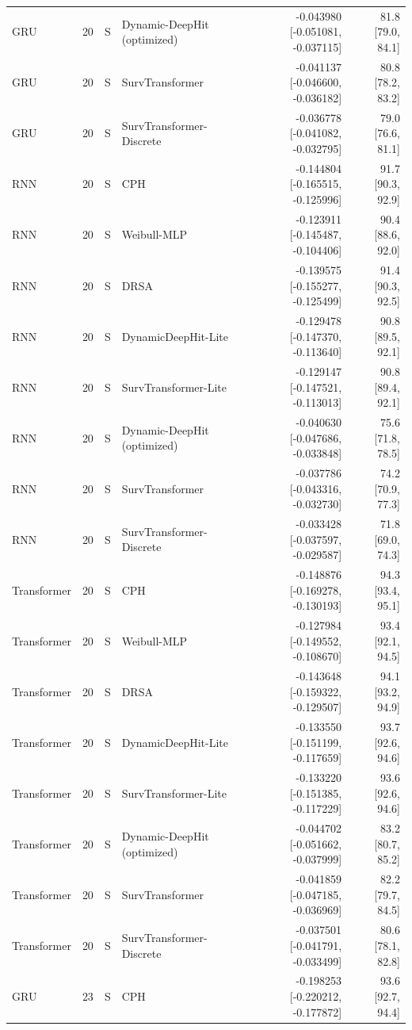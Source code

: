\begin{longtable}{lll p{3.0cm} rr}
GRU & 20 & S & Dynamic-DeepHit (optimized) & -0.043980 [-0.051081, -0.037115] & 81.8 [79.0, 84.1]\\
GRU & 20 & S & SurvTransformer & -0.041137 [-0.046600, -0.036182] & 80.8 [78.2, 83.2]\\
GRU & 20 & S & SurvTransformer-Discrete & -0.036778 [-0.041082, -0.032795] & 79.0 [76.6, 81.1]\\
RNN & 20 & S & CPH & -0.144804 [-0.165515, -0.125996] & 91.7 [90.3, 92.9]\\
RNN & 20 & S & Weibull-MLP & -0.123911 [-0.145487, -0.104406] & 90.4 [88.6, 92.0]\\
RNN & 20 & S & DRSA & -0.139575 [-0.155277, -0.125499] & 91.4 [90.3, 92.5]\\
RNN & 20 & S & DynamicDeepHit-Lite & -0.129478 [-0.147370, -0.113640] & 90.8 [89.5, 92.1]\\
RNN & 20 & S & SurvTransformer-Lite & -0.129147 [-0.147521, -0.113013] & 90.8 [89.4, 92.1]\\
RNN & 20 & S & Dynamic-DeepHit (optimized) & -0.040630 [-0.047686, -0.033848] & 75.6 [71.8, 78.5]\\
RNN & 20 & S & SurvTransformer & -0.037786 [-0.043316, -0.032730] & 74.2 [70.9, 77.3]\\
RNN & 20 & S & SurvTransformer-Discrete & -0.033428 [-0.037597, -0.029587] & 71.8 [69.0, 74.3]\\
Transformer & 20 & S & CPH & -0.148876 [-0.169278, -0.130193] & 94.3 [93.4, 95.1]\\
Transformer & 20 & S & Weibull-MLP & -0.127984 [-0.149552, -0.108670] & 93.4 [92.1, 94.5]\\
Transformer & 20 & S & DRSA & -0.143648 [-0.159322, -0.129507] & 94.1 [93.2, 94.9]\\
Transformer & 20 & S & DynamicDeepHit-Lite & -0.133550 [-0.151199, -0.117659] & 93.7 [92.6, 94.6]\\
Transformer & 20 & S & SurvTransformer-Lite & -0.133220 [-0.151385, -0.117229] & 93.6 [92.6, 94.6]\\
Transformer & 20 & S & Dynamic-DeepHit (optimized) & -0.044702 [-0.051662, -0.037999] & 83.2 [80.7, 85.2]\\
Transformer & 20 & S & SurvTransformer & -0.041859 [-0.047185, -0.036969] & 82.2 [79.7, 84.5]\\
Transformer & 20 & S & SurvTransformer-Discrete & -0.037501 [-0.041791, -0.033499] & 80.6 [78.1, 82.8]\\
GRU & 23 & S & CPH & -0.198253 [-0.220212, -0.177872] & 93.6 [92.7, 94.4]\\

\end{longtable}
